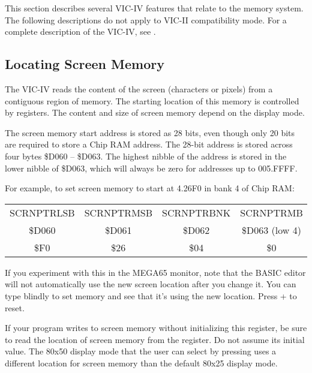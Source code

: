 This section describes several VIC-IV features that relate to the memory system. The following descriptions do not apply to VIC-II compatibility mode. For a complete description of the VIC-IV, see .

\subsection{Locating Screen Memory}

The VIC-IV reads the content of the screen (characters or pixels) from a contiguous region of memory. The starting location of this memory is controlled by registers. The content and size of screen memory depend on the display mode.

The screen memory start address is stored as 28 bits, even though only 20 bits are required to store a Chip RAM address. The 28-bit address is stored across four bytes \$D060 -- \$D063. The highest nibble of the address is stored in the lower nibble of \$D063, which will always be zero for addresses up to 005.FFFF.

For example, to set screen memory to start at 4.26F0 in bank 4 of Chip RAM:

\begin{center}
\begin{tabular}{|c|c|c|c|}
\hline
SCRNPTRLSB & SCRNPTRMSB & SCRNPTRBNK & SCRNPTRMB \\
\$D060 & \$D061 & \$D062 & \$D063 (low 4) \\
\hline
\$F0 & \$26 & \$04 & \$0 \\
\hline
\end{tabular}
\end{center}


If you experiment with this in the MEGA65 monitor, note that the BASIC editor will not automatically use the new screen location after you change it. You can type blindly to set memory and see that it's using the new location. Press  +  to reset.

If your program writes to screen memory without initializing this register, be sure to read the location of screen memory from the register. Do not assume its initial value. The 80x50 display mode that the user can select by pressing   uses a different location for screen memory than the default 80x25 display mode.

